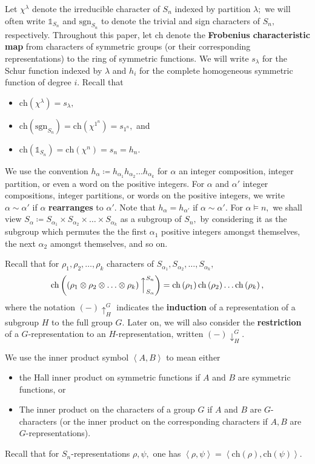 \documentclass[ALCO, Unicode]{cedram}
\def\ch{\mathrm{ch}}
\def\sgn{\mathrm{sgn}}
\def\ch{\mathrm{ch}}
\begin{document}
Let \textbf{$\chi^\lambda$} denote the irreducible character of $S_n$ indexed by partition $\lambda;$ we will often write \textbf{$\mathbb{1}_{S_n}$} and \textbf{$\sgn_{S_n}$} to denote the trivial and sign characters of $S_n,$ respectively. Throughout this paper, let \textbf{$\ch$} denote the \textbf{Frobenius characteristic map} from characters of symmetric groups (or their corresponding representations) to the ring of symmetric functions. We will write \textbf{$s_\lambda$} for the Schur function indexed by $\lambda$ and \textbf{$h_i$} for the complete homogeneous symmetric function of degree $i.$  Recall that
\begin{itemize}
    \item $\ch \left(\chi^\lambda\right) = s_\lambda,$
    \item  $\ch \left(\sgn_{S_n}\right) = \ch \left(\chi^{1^n}\right) = s_{1^n},$ and
    \item $\ch \left(\mathbb{1}_{S_n}\right) = \ch \left(\chi^{n}\right) = s_n = h_n.$
\end{itemize}


 We use the convention \textbf{$h_\alpha  \coloneqq  h_{\alpha_1}h_{\alpha_2} \ldots h_{\alpha_k}$} for $\alpha$ an integer composition, integer partition, or even a word on the positive integers. For $\alpha$ and $\alpha'$ integer compositions, integer partitions, or words on the positive integers, we write $\alpha \sim \alpha'$ if $\alpha$ \textbf{rearranges} to $\alpha'$. Note that $h_{\alpha} = h_{\alpha'}$ if $\alpha \sim \alpha'.$ For $\alpha \vDash n,$ we shall view \textbf{$S_{\alpha}  \coloneqq  S_{\alpha_1} \times S_{\alpha_2} \times \ldots \times S_{\alpha_k}$} as a subgroup of $S_n,$ by considering it as the subgroup which permutes the the first $\alpha_1$ positive integers amongst themselves, the next $\alpha_2$ amongst themselves, and so on.

Recall that for $\rho_1, \rho_2, \ldots, \rho_k$ characters of $S_{\alpha_1}, S_{\alpha_2}, \ldots, S_{\alpha_k},$
\[\ch\left( \left(\rho_1 \otimes \rho_2 \otimes \ldots \otimes \rho_k \right) \Big \uparrow_{S_\alpha}^{S_n}\right) = \ch \left(\rho_1\right) \ch \left(\rho_2\right) \ldots \ch\left(\rho_k\right),\] where the notation \textbf{$(-)\uparrow_H^G$} indicates the \textbf{induction} of a representation of a subgroup $H$ to the full group $G.$ Later on, we will also consider the \textbf{restriction} of a $G$-representation to an $H$-representation, written \textbf{$(-)\downarrow_H^G.$}

We use the inner product symbol \textbf{$\left \langle A, B \right \rangle$} to mean either
\begin{itemize}
    \item the Hall inner product on symmetric functions if $A$ and $B$ are symmetric functions, or
    \item The inner product on the characters of a group $G$ if $A$ and $B$ are $G$-characters (or the inner product on the corresponding characters if $A, B$ are $G$-representations).
\end{itemize}
Recall that for $S_n$-representations $\rho, \psi,$ one has $\left \langle \rho, \psi \right \rangle = \left \langle \ch (\rho), \ch (\psi) \right \rangle.$
\end{document}
